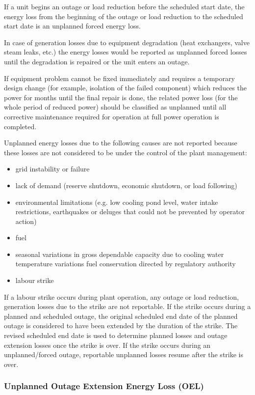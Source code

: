 If a unit begins an outage or load reduction before the scheduled
start date, the energy loss from the beginning of the outage or load
reduction to the scheduled start date is an unplanned forced energy
loss.

In case of generation losses due to equipment degradation (heat
exchangers, valve steam leaks, etc.) the energy losses would be
reported as unplanned forced losses until the degradation is repaired
or the unit enters an outage.

If equipment problem cannot be fixed immediately and requires a
temporary design change (for example, isolation of the failed
component) which reduces the power for months until the final repair
is done, the related power loss (for the whole period of reduced
power) should be classified as unplanned until all corrective
maintenance required for operation at full power operation is
completed.

Unplanned energy losses due to the following causes are not reported because these losses are not considered to be under the control of the plant management:
\begin{itemize}
\item grid instability or failure
\item lack of demand (reserve shutdown, economic shutdown, or load following)
\item environmental limitations (e.g. low cooling pond level, water intake restrictions, earthquakes or deluges that could not be prevented by operator action)
\item fuel
\item seasonal variations in gross dependable capacity due to cooling water temperature variations
fuel conservation directed by regulatory authority
\item labour strike
\end{itemize}

If a labour strike occurs during plant operation, any outage or load
reduction, generation losses due to the strike are not reportable. If
the strike occurs during a planned and scheduled outage, the original
scheduled end date of the planned outage is considered to have been
extended by the duration of the strike. The revised scheduled end date
is used to determine planned losses and outage extension losses once
the strike is over. If the strike occurs during an unplanned/forced
outage, reportable unplanned losses resume after the strike is over.

\subsubsection{Unplanned Outage Extension Energy Loss (OEL)}

